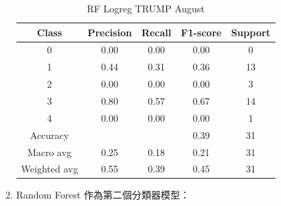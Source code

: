 \begin{enumerate}
\begin{enumerate}
\begin{table}[H]
                \vspace{1em} %
                
                \scriptsize
                \begin{tabular}{c|cccc}
                \hline
                Class & Precision & Recall & F1-score & Support \\
                \hline
                0 & 0.00 & 0.00 & 0.00 & 0 \\
                1 & 0.44 & 0.31 & 0.36 & 13 \\
                2 & 0.00 & 0.00 & 0.00 & 3 \\
                3 & 0.80 & 0.57 & 0.67 & 14 \\
                4 & 0.00 & 0.00 & 0.00 & 1 \\
                \hline
                Accuracy &       &      & 0.39 & 31 \\
                Macro avg & 0.25 & 0.18 & 0.21 & 31 \\
                Weighted avg & 0.55 & 0.39 & 0.45 & 31 \\
                \hline
                \end{tabular}
                \caption{RF Logreg TRUMP August}
                \label{tab:classifier_2_report_rf_logreg_trump_filtered_aug}
                \end{table}


                \pagebreak
    
                \item Random Forest 作為第二個分類器模型：


\end{enumerate}
\end{enumerate}
